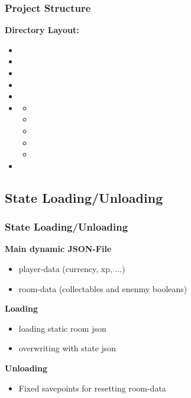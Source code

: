 \documentclass[11pt,t,usepdftitle=false,aspectratio=169]{beamer}
\begin{document}
\begin{frame}
	\frametitle{Project Structure}

	\textbf{Directory Layout:}

	\begin{itemize}
		\item {}
		\item {}
		\item {}
		\item {}
		\item {}
		\item {}
		      \begin{itemize}
			      \item {}
			      \item {}
			      \item {}
			      \item {}
			      \item {}
		      \end{itemize}
		\item {}
	\end{itemize}

\end{frame}

\subsection{State Loading/Unloading}

\begin{frame}
	\frametitle{State Loading/Unloading}

	\textbf{Main dynamic JSON-File}

	\begin{itemize}
		\item player-data (currency, xp, ...)
		\item room-data (collectables and enenmy booleans)
	\end{itemize}

	\textbf{Loading}

	\begin{itemize}
		\item loading static room json
		\item overwriting with state json
	\end{itemize}

	\textbf{Unloading}

	\begin{itemize}
		\item Fixed savepoints for resetting room-data
	\end{itemize}

\end{frame}
\end{document}
